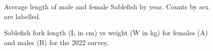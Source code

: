 \documentclass[12pt]{article}\usepackage[]{graphicx}\usepackage[]{color}
\begin{document}
\begin{figure}[htb]

{\centering {} 

}

\caption{Average length of male and female Sablefish by year. Counts by sex are labelled.}\label{fig:figure12}
\end{figure}
\clearpage


\begin{figure}[htb]

{\centering {} 

}

\caption{Sablefish fork length (L in cm) vs weight (W in kg) for females (A) and males (B) for the 2022 survey.}\label{fig:figure13}
\end{figure}
\end{document}
